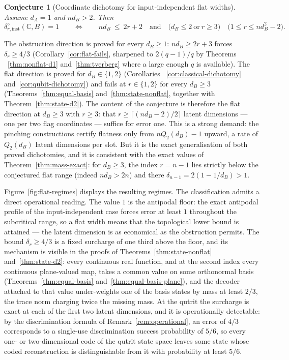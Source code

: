 \documentclass[11pt,a4paper]{article}
\newtheorem{conjecture}[theorem]{Conjecture}
\begin{document}
\begin{conjecture}[Coordinate dichotomy for input-independent flat widths]
\label{con:coord-flat}
Assume $d_A=1$ and $nd_B>2$. Then
\[
\delta_{r,\mathrm{inst}}^{\diamond}(\mathbb C,B)=1
\qquad\Longleftrightarrow\qquad
nd_B\ \le\ 2r+2
\quad\text{and}\quad
\bigl(d_B\le2\ \text{or}\ r\ge3\bigr) \quad\big(1\le r\le nd_B^2-2\big).
\]
\end{conjecture}

The obstruction direction is proved for every $d_B\ge1$: $nd_B\ge2r+3$ forces
$\delta_r\ge4/3$ (Corollary~\ref{cor:flat-fails}, sharpened to $2(q-1)/q$ by Theorems
~\ref{thm:nonflat-d1} and~\ref{thm:tverberg} where a large enough $q$ is available).
The flat direction is proved for $d_B\in\{1,2\}$ (Corollaries ~\ref{cor:classical-dichotomy} and~\ref{cor:qubit-dichotomy}) and fails at $r\in\{1,2\}$ for every $d_B\ge3$ (Theorems~\ref{thm:equal-basis} and~\ref{thm:state-nonflat}, together with Theorem~\ref{thm:state-d2}). The content of the conjecture is therefore the flat direction at $d_B\ge3$ with $r\ge3$: that
$r\ge\lceil(nd_B-2)/2\rceil$ latent dimensions --- one per two flag coordinates ---
suffice for error one. This is a strong demand: the pinching constructions certify
flatness only from $nQ_2(d_B)-1$ upward, a rate of $Q_2(d_B)$ latent dimensions per
slot. But it is the exact generalisation of both proved dichotomies, and it is
consistent with the exact values of Theorem~\ref{thm:mass-exact}: for $d_B\ge3$, the
index $r=n-1$ lies strictly below the conjectured flat range (indeed $nd_B>2n$) and
there $\delta_{n-1}=2(1-1/d_B)>1$.

Figure~\ref{fig:flat-regimes} displays the resulting regimes. The classification admits a direct operational reading. The value $1$ is the antipodal floor: the exact antipodal profile of the input-independent case forces error at least $1$ throughout the subcritical range, so a flat width means that the topological lower bound is attained --- the latent dimension is as economical as the obstruction permits. The bound $\delta_r\ge4/3$ is a fixed surcharge of one third above the floor, and its mechanism is visible in the proofs of Theorems~\ref{thm:state-nonflat} and~\ref{thm:state-d2}: every continuous real function, and at the second index every continuous plane-valued map, takes a common value on some orthonormal basis (Theorems~\ref{thm:equal-basis} and~\ref{thm:equal-basis-plane}), and the decoder attached to that value under-weights one of the basis states by mass at least $2/3$, the trace norm charging twice the missing mass. At the qutrit the surcharge is exact at each of the first two latent dimensions, and it is operationally detectable: by the discrimination formula of Remark~\ref{rem:operational}, an error of $4/3$ corresponds to a single-use discrimination success probability of $5/6$, so every one- or two-dimensional code of the qutrit state space leaves some state whose coded reconstruction is distinguishable from it with probability at least $5/6$.
\end{document}
